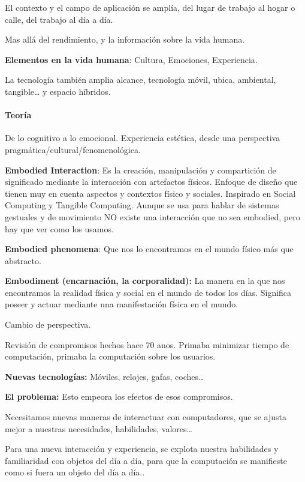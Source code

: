 \documentclass[12pt]{report} %
\begin{document}
El contexto y el campo de aplicación se amplía, del lugar de trabajo al
hogar o calle, del trabajo al día a día.

Mas allá del rendimiento, y la información sobre la vida humana.

\textbf{Elementos en la vida humana}: Cultura, Emociones, Experiencia.

La tecnología también amplia alcance, tecnología móvil, ubica,
ambiental, tangible\ldots{} y espacio híbridos.

\hypertarget{teoruxeda-2}{%
\paragraph{Teoría}\label{teoruxeda-2}}

De lo cognitivo a lo emocional. Experiencia estética, desde una
perspectiva pragmática/cultural/fenomenológica.

\textbf{Embodied Interaction}: Es la creación, manipulación y
compartición de significado mediante la interacción con artefactos
físicos. Enfoque de diseño que tienen muy en cuenta aspectos y contextos
físico y sociales. Inspirado en Social Computing y Tangible Computing.
Aunque se usa para hablar de sistemas gestuales y de movimiento NO
existe una interacción que no sea embodied, pero hay que ver como los
usamos.

\textbf{Embodied phenomena}: Que nos lo encontramos en el mundo físico
más que abstracto.

\textbf{Embodiment (encarnación, la corporalidad):} La manera en la que
nos encontramos la realidad física y social en el mundo de todos los
días. Significa poseer y actuar mediante una manifestación física en el
mundo.

Cambio de perspectiva.

Revisión de compromisos hechos hace 70 anos. Primaba minimizar tiempo de
computación, primaba la computación sobre los usuarios.

\textbf{Nuevas tecnologías:} Móviles, relojes, gafas, coches\ldots{}

\textbf{El problema:} Esto empeora los efectos de esos compromisos.

Necesitamos nuevas maneras de interactuar con computadores, que se
ajusta mejor a nuestras necesidades, habilidades, valores\ldots{}

Para una nueva interacción y experiencia, se explota nuestra habilidades
y familiaridad con objetos del día a día, para que la computación se
manifieste como si fuera un objeto del día a día..
\end{document}

